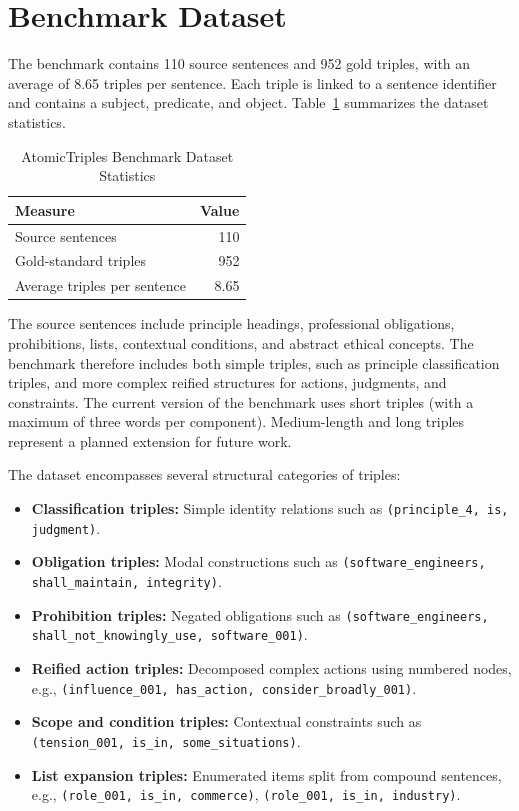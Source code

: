 \documentclass[conference]{IEEEtran}
\begin{document}
\section{Benchmark Dataset}

The benchmark contains 110 source sentences and 952 gold triples, with an average of 8.65 triples per sentence. Each triple is linked to a sentence identifier and contains a subject, predicate, and object. Table~\ref{tab:dataset_stats} summarizes the dataset statistics.

\begin{table}[htbp]
\caption{AtomicTriples Benchmark Dataset Statistics}
\label{tab:dataset_stats}
\centering
\begin{tabular}{lr}
\toprule
\textbf{Measure} & \textbf{Value} \\
\midrule
Source sentences & 110 \\
Gold-standard triples & 952 \\
Average triples per sentence & 8.65 \\
\bottomrule
\end{tabular}
\end{table}

The source sentences include principle headings, professional obligations, prohibitions, lists, contextual conditions, and abstract ethical concepts. The benchmark therefore includes both simple triples, such as principle classification triples, and more complex reified structures for actions, judgments, and constraints. The current version of the benchmark uses short triples (with a maximum of three words per component). Medium-length and long triples represent a planned extension for future work.

The dataset encompasses several structural categories of triples:

\begin{itemize}[leftmargin=*]
\item \textbf{Classification triples:} Simple identity relations such as \texttt{(principle\_4, is, judgment)}.
\item \textbf{Obligation triples:} Modal constructions such as \texttt{(software\_engineers, shall\_maintain, integrity)}.
\item \textbf{Prohibition triples:} Negated obligations such as \texttt{(software\_engineers, shall\_not\_knowingly\_use, software\_001)}.
\item \textbf{Reified action triples:} Decomposed complex actions using numbered nodes, e.g., \texttt{(influence\_001, has\_action, consider\_broadly\_001)}.
\item \textbf{Scope and condition triples:} Contextual constraints such as \texttt{(tension\_001, is\_in, some\_situations)}.
\item \textbf{List expansion triples:} Enumerated items split from compound sentences, e.g., \texttt{(role\_001, is\_in, commerce)}, \texttt{(role\_001, is\_in, industry)}.
\end{itemize}
\end{document}
